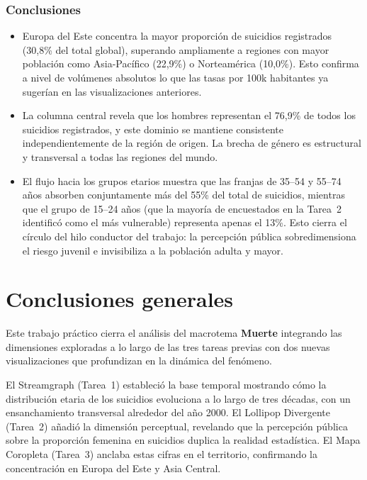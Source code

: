\documentclass[12pt, letterpaper]{article}
\begin{document}
\subsubsection*{Conclusiones}

\begin{itemize}
  \item Europa del Este concentra la mayor proporci\'on de suicidios registrados (30,8\% del total global), superando ampliamente a regiones con mayor poblaci\'on como Asia-Pac\'ifico (22,9\%) o Norteam\'erica (10,0\%). Esto confirma a nivel de vol\'umenes absolutos lo que las tasas por 100k habitantes ya suger\'ian en las visualizaciones anteriores.
  \item La columna central revela que los hombres representan el 76,9\% de todos los suicidios registrados, y este dominio se mantiene consistente independientemente de la regi\'on de origen. La brecha de g\'enero es estructural y transversal a todas las regiones del mundo.
  \item El flujo hacia los grupos etarios muestra que las franjas de 35--54 y 55--74 a\~nos absorben conjuntamente m\'as del 55\% del total de suicidios, mientras que el grupo de 15--24 a\~nos (que la mayor\'ia de encuestados en la Tarea~2 identific\'o como el m\'as vulnerable) representa apenas el 13\%. Esto cierra el c\'irculo del hilo conductor del trabajo: la percepci\'on p\'ublica sobredimensiona el riesgo juvenil e invisibiliza a la poblaci\'on adulta y mayor.
\end{itemize}


\section{Conclusiones generales}

Este trabajo pr\'actico cierra el an\'alisis del macrotema \textbf{Muerte} integrando las dimensiones exploradas a lo largo de las tres tareas previas con dos nuevas visualizaciones que profundizan en la din\'amica del fen\'omeno.

El Streamgraph (Tarea~1) estableci\'o la base temporal mostrando c\'omo la distribuci\'on etaria de los suicidios evoluciona a lo largo de tres d\'ecadas, con un ensanchamiento transversal alrededor del a\~no 2000. El Lollipop Divergente (Tarea~2) a\~nadi\'o la dimensi\'on perceptual, revelando que la percepci\'on p\'ublica sobre la proporci\'on femenina en suicidios duplica la realidad estad\'istica. El Mapa Coropleta (Tarea~3) anclaba estas cifras en el territorio, confirmando la concentraci\'on en Europa del Este y Asia Central.
\end{document}
